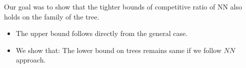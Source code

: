 \documentclass{report}
\begin{document}
    
    
    
    
    
    
    
    
    
    
    
    
    
    
    
    
    
    
    
    
    
    
    
    
    Our goal was to show that the tighter bounds of competitive ratio of NN also holds on the family of the tree.    
\begin{itemize}
    \item {
        The upper bound follows directly from the general case.   
    }
    \item {
        We show that: The lower bound on trees remains same if we follow {$NN$} approach.
    }
\end{itemize}
\newline
%
% 
\end{document}
